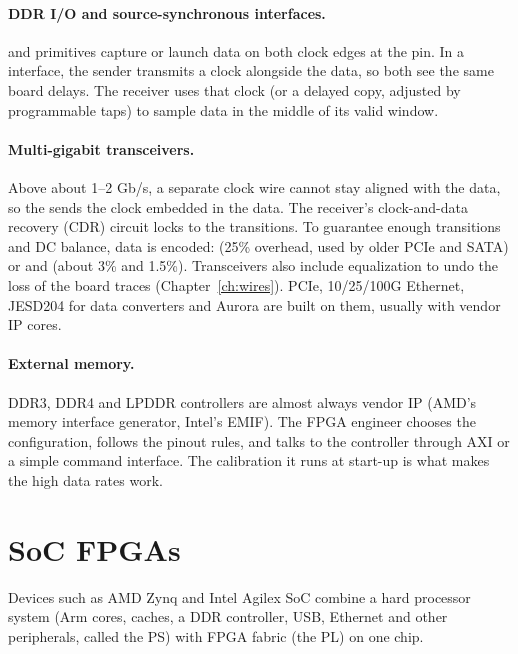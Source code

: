 \paragraph{DDR I/O and source-synchronous interfaces.}  and  primitives capture or launch data on both clock edges at the pin. In a  interface, the sender transmits a clock alongside the data, so both see the same board delays. The receiver uses that clock (or a delayed copy, adjusted by programmable  taps) to sample data in the middle of its valid window.

\paragraph{Multi-gigabit transceivers.} Above about 1--2 Gb/s, a separate clock wire cannot stay aligned with the data, so the  sends the clock embedded in the data. The receiver's clock-and-data recovery (CDR) circuit locks to the transitions. To guarantee enough transitions and DC balance, data is encoded:  (25\% overhead, used by older PCIe and SATA) or  and  (about 3\% and 1.5\%). Transceivers also include equalization to undo the loss of the board traces (Chapter~\ref{ch:wires}). PCIe, 10/25/100G Ethernet, JESD204 for data converters and Aurora are built on them, usually with vendor IP cores.

\paragraph{External memory.} DDR3, DDR4 and LPDDR controllers are almost always vendor IP (AMD's memory interface generator, Intel's EMIF). The FPGA engineer chooses the configuration, follows the pinout rules, and talks to the controller through AXI or a simple command interface. The calibration it runs at start-up is what makes the high data rates work.

\section{SoC FPGAs}

Devices such as AMD Zynq and Intel Agilex SoC combine a hard processor system (Arm cores, caches, a DDR controller, USB, Ethernet and other peripherals, called the PS) with FPGA fabric (the PL) on one chip.


